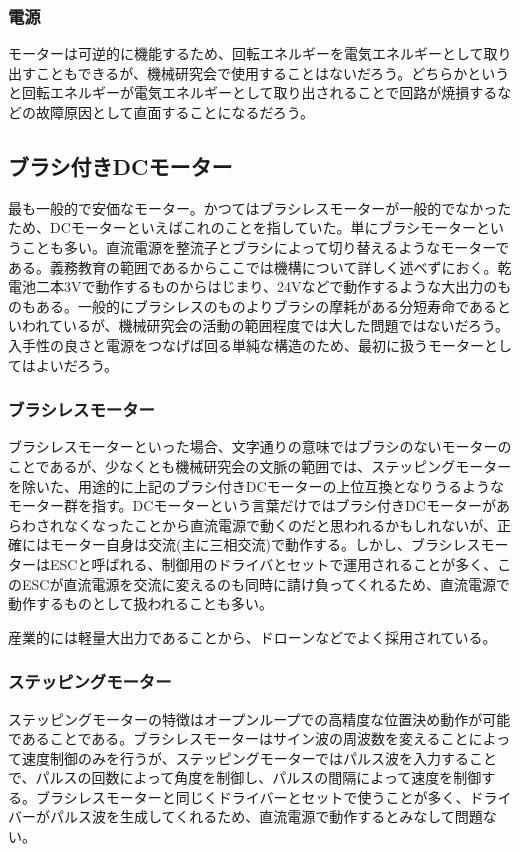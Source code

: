 \documentclass[a4paper,titlepage]{ujarticle}
\begin{document}
\subsubsection{電源}
モーターは可逆的に機能するため、回転エネルギーを電気エネルギーとして取り出すこともできるが、機械研究会で使用することはないだろう。どちらかというと回転エネルギーが電気エネルギーとして取り出されることで回路が焼損するなどの故障原因として直面することになるだろう。
\subsection{ブラシ付きDCモーター}
最も一般的で安価なモーター。かつてはブラシレスモーターが一般的でなかったため、DCモーターといえばこれのことを指していた。単にブラシモーターということも多い。直流電源を整流子とブラシによって切り替えるようなモーターである。義務教育の範囲であるからここでは機構について詳しく述べずにおく。乾電池二本3Vで動作するものからはじまり、24Vなどで動作するような大出力のものもある。一般的にブラシレスのものよりブラシの摩耗がある分短寿命であるといわれているが、機械研究会の活動の範囲程度では大した問題ではないだろう。入手性の良さと電源をつなげば回る単純な構造のため、最初に扱うモーターとしてはよいだろう。
\subsubsection{ブラシレスモーター}
ブラシレスモーターといった場合、文字通りの意味ではブラシのないモーターのことであるが、少なくとも機械研究会の文脈の範囲では、ステッピングモーターを除いた、用途的に上記のブラシ付きDCモーターの上位互換となりうるようなモーター群を指す。DCモーターという言葉だけではブラシ付きDCモーターがあらわされなくなったことから直流電源で動くのだと思われるかもしれないが、正確にはモーター自身は交流(主に三相交流)で動作する。しかし、ブラシレスモーターはESCと呼ばれる、制御用のドライバとセットで運用されることが多く、このESCが直流電源を交流に変えるのも同時に請け負ってくれるため、直流電源で動作するものとして扱われることも多い。

産業的には軽量大出力であることから、ドローンなどでよく採用されている。
\subsubsection{ステッピングモーター}
ステッピングモーターの特徴はオープンループでの高精度な位置決め動作が可能であることである。ブラシレスモーターはサイン波の周波数を変えることによって速度制御のみを行うが、ステッピングモーターではパルス波を入力することで、パルスの回数によって角度を制御し、パルスの間隔によって速度を制御する。ブラシレスモーターと同じくドライバーとセットで使うことが多く、ドライバーがパルス波を生成してくれるため、直流電源で動作するとみなして問題ない。
\end{document}
